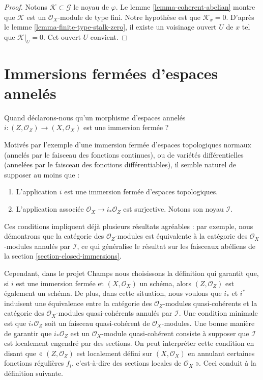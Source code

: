 \begin{proof}
Notons $\mathcal{K} \subset \mathcal{G}$ le noyau de $\varphi$.
Le lemme \ref{lemma-coherent-abelian} montre que $\mathcal{K}$ est
un $\mathcal{O}_X$-module de type fini. Notre hypothèse est que
$\mathcal{K}_x = 0$. D'après le lemme \ref{lemma-finite-type-stalk-zero},
il existe un voisinage ouvert $U$ de $x$ tel que $\mathcal{K}|_U = 0$.
Cet ouvert $U$ convient.
\end{proof}













\section{Immersions fermées d'espaces annelés}
\label{section-closed-immersion}

\noindent
Quand déclarons-nous qu'un morphisme d'espaces annelés
$i : (Z, \mathcal{O}_Z) \to (X, \mathcal{O}_X)$
est une immersion fermée ?

\medskip\noindent
Motivés par l'exemple d'une immersion fermée d'espaces topologiques normaux
(annelés par le faisceau des fonctions continues), ou de variétés différentielles
(annelées par le faisceau des fonctions différentiables), il semble naturel de
supposer au moins que :
\begin{enumerate}
\item L'application $i$ est une immersion fermée d'espaces topologiques.
\item L'application associée $\mathcal{O}_X \to i_*\mathcal{O}_Z$
est surjective. Notons son noyau $\mathcal{I}$.
\end{enumerate}
Ces conditions impliquent déjà plusieurs résultats agréables : par exemple,
nous démontrons que la catégorie des $\mathcal{O}_Z$-modules est équivalente à
la catégorie des $\mathcal{O}_X$-modules annulés par $\mathcal{I}$,
ce qui généralise le résultat sur les faisceaux abéliens de la
section \ref{section-closed-immersions}.

\medskip\noindent
Cependant, dans le projet Champs nous choisissons la
définition qui garantit que, si $i$ est une immersion fermée
et $(X, \mathcal{O}_X)$ un schéma, alors $(Z, \mathcal{O}_Z)$
est également un schéma. De plus, dans cette situation, nous voulons que $i_*$ et $i^*$
induisent une équivalence entre la catégorie des
$\mathcal{O}_Z$-modules quasi-cohérents et la catégorie des
$\mathcal{O}_X$-modules quasi-cohérents annulés par $\mathcal{I}$.
Une condition minimale est que $i_*\mathcal{O}_Z$ soit un
faisceau quasi-cohérent de $\mathcal{O}_X$-modules.
Une bonne manière de garantir que $i_*\mathcal{O}_Z$ est un
$\mathcal{O}_X$-module quasi-cohérent consiste à supposer que
$\mathcal{I}$ est localement engendré par des sections.
On peut interpréter cette condition en disant que « $(Z, \mathcal{O}_Z)$ est
localement défini sur $(X, \mathcal{O}_X)$ en annulant certaines fonctions régulières
$f_i$, c'est-à-dire des sections locales de $\mathcal{O}_X$ ».
Ceci conduit à la définition suivante.

